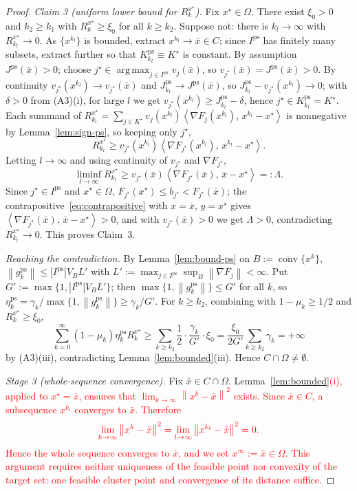 \documentclass[]{interact}
\theoremstyle{plain}
\theoremstyle{definition}
\theoremstyle{remark}
\newcommand{\norm}[1]{\left\lVert #1 \right\rVert}
\newcommand{\abs}[1]{\left\lvert #1 \right\rvert}
\newcommand{\inner}[2]{\left\langle #1,\, #2 \right\rangle}
\DeclareMathOperator*{\argmax}{arg\,max}
\DeclareMathOperator{\conv}{conv}
\newcommand{\ps}{\mathrm{ps}}
\begin{document}
\begin{proof}
\smallskip
\emph{Claim 3 (uniform lower bound for $R^{x^\star}_k$).} Fix $x^\star\in\Omega$. There
exist $\xi_0>0$ and $k_2\ge k_1$ with $R^{x^\star}_k\ge\xi_0$ for all $k\ge k_2$. Suppose
not: there is $k_l\to\infty$ with $R^{x^\star}_{k_l}\to0$. As $\{x^{k_l}\}$ is bounded,
extract $x^{k_l}\to\bar x\in C$; since $I^{\ps}$ has finitely many subsets, extract
further so that $K^{\ps}_{k_l}\equiv K^\star$ is constant. By assumption
$J^{\ps}(\bar x)>0$; choose $j^\star\in\argmax_{j\in I^{\ps}}v_j(\bar x)$, so
$v_{j^\star}(\bar x)=J^{\ps}(\bar x)>0$. By continuity $v_{j^\star}(x^{k_l})\to
v_{j^\star}(\bar x)$ and $J^{\ps}_{k_l}\to J^{\ps}(\bar x)$, so
$J^{\ps}_{k_l}-v_{j^\star}(x^{k_l})\to0$; with $\delta>0$ from (A3)(i), for large $l$ we
get $v_{j^\star}(x^{k_l})\ge J^{\ps}_{k_l}-\delta$, hence $j^\star\in K^{\ps}_{k_l}=K^\star$.
Each summand of
$R^{x^\star}_{k_l}=\sum_{j\in K^\star}v_j(x^{k_l})\inner{\nabla F_j(x^{k_l})}{x^{k_l}-x^\star}$
is nonnegative by Lemma~\ref{lem:sign-ps}, so keeping only $j^\star$,
\[
R^{x^\star}_{k_l}\ge v_{j^\star}(x^{k_l})\inner{\nabla F_{j^\star}(x^{k_l})}{x^{k_l}-x^\star}.
\]
Letting $l\to\infty$ and using continuity of $v_{j^\star}$ and $\nabla F_{j^\star}$,
\[
\liminf_{l\to\infty}R^{x^\star}_{k_l}\ge v_{j^\star}(\bar x)\inner{\nabla F_{j^\star}(\bar x)}{\bar x-x^\star}=:\Lambda .
\]
Since $j^\star\in I^{\ps}$ and $x^\star\in\Omega$, $F_{j^\star}(x^\star)\le b_{j^\star}<F_{j^\star}(\bar x)$;
the contrapositive~\eqref{eq:contrapositive} with $x=\bar x$, $y=x^\star$ gives
$\inner{\nabla F_{j^\star}(\bar x)}{\bar x-x^\star}>0$, and with $v_{j^\star}(\bar x)>0$ we
get $\Lambda>0$, contradicting $R^{x^\star}_{k_l}\to0$. This proves Claim~3.

\smallskip
\emph{Reaching the contradiction.} By Lemma~\ref{lem:bound-ps} on
$B:=\overline{\conv}\{x^k\}$, $\norm{g^{\ps}_k}\le\abs{I^{\ps}}V_B L'$ with
$L':=\max_{j\in I^{\ps}}\sup_B\norm{\nabla F_j}<\infty$. Put
$G':=\max\{1,\abs{I^{\ps}}V_B L'\}$; then $\max\{1,\norm{g^{\ps}_k}\}\le G'$ for all $k$,
so $\eta^{\ps}_k=\gamma_k/\max\{1,\norm{g^{\ps}_k}\}\ge\gamma_k/G'$. For $k\ge k_2$,
combining with $1-\mu_k\ge1/2$ and $R^{x^\star}_k\ge\xi_0$,
\[
\sum_{k=0}^\infty(1-\mu_k)\eta^{\ps}_k R^{x^\star}_k\ge\sum_{k\ge k_2}\frac12\cdot\frac{\gamma_k}{G'}\cdot\xi_0=\frac{\xi_0}{2G'}\sum_{k\ge k_2}\gamma_k=+\infty
\]
by (A3)(iii), contradicting Lemma~\ref{lem:bounded}(iii). Hence $C\cap\Omega\ne\emptyset$.

\emph{Stage 3 (whole-sequence convergence).} Fix $\bar x\in C\cap\Omega$.
Lemma~\leavevmode\textcolor{red}{\ref{lem:bounded}(i), applied to $x^\star=\bar x$, ensures that
$\lim_{k\to\infty}\norm{x^k-\bar x}^2$ exists. Since $\bar x\in C$, a subsequence
$x^{k_l}$ converges to $\bar x$. Therefore}
\[\textcolor{red}{
\lim_{k\to\infty}\norm{x^k-\bar x}^2
=\lim_{l\to\infty}\norm{x^{k_l}-\bar x}^2=0.
}\]
\leavevmode\textcolor{red}{Hence the whole sequence converges to $\bar x$, and we set $x^\infty:=\bar x\in\Omega$.
This argument requires neither uniqueness of the feasible point nor convexity of the
target set: one feasible cluster point and convergence of its distance suffice.}
\end{proof}
\end{document}
